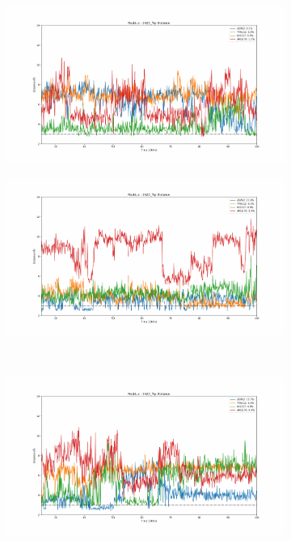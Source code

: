 \documentclass[fleqn,10pt]{wlscirep}
\begin{document}
\begin{figure}[!ht]
\centering
  \begin{subfigure}{.45\textwidth}
     \centering
     \includegraphics[width=.95\linewidth]{2AZC_flip/2AZC_flip-dist_0.pdf}
  \end{subfigure}
  \begin{subfigure}{.45\textwidth}
     \centering
     \includegraphics[width=.95\linewidth]{2AZC_flip/2AZC_flip-dist_1.pdf}
  \end{subfigure}
  \\
  \begin{subfigure}{.45\textwidth}
     \centering
     \includegraphics[width=.95\linewidth]{2AZC_flip/2AZC_flip-dist_2.pdf}

\end{subfigure}
\end{figure}
\end{document}
